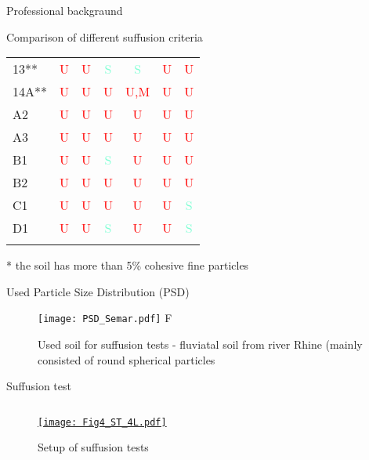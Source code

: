 \documentclass[10pt,xcolor=dvipsnames]{beamer}
\begin{document}
{\begin{frame}{Professional backgraund}
\begin{frame}{Comparison of different suffusion criteria}
\begin{table}[b]
{\begin{center}
\begin{tabular}{lcccccc}
13**&  \textcolor{red}{U} & \textcolor{red}{U}  & \textcolor{Aquamarine}{S} & \textcolor{Aquamarine}{S}& \textcolor{red}{U} & \textcolor{red}{U} \\
14A**&\textcolor{red}{U} & \textcolor{red}{U}   & \textcolor{red}{U}    & \textcolor{red}{U,M} & \textcolor{red}{U} & \textcolor{red}{U} \\
A2 & \textcolor{red}{U} & \textcolor{red}{U}    & \textcolor{red}{U}    & \textcolor{red}{U}   & \textcolor{red}{U} & \textcolor{red}{U} \\
A3 & \textcolor{red}{U} & \textcolor{red}{U}    & \textcolor{red}{U}    & \textcolor{red}{U}   & \textcolor{red}{U} & \textcolor{red}{U}\\
B1 & \textcolor{red}{U} & \textcolor{red}{U}    & \textcolor{Aquamarine}{S} &\textcolor{red}{U}    & \textcolor{red}{U} & \textcolor{red}{U} \\
B2 & \textcolor{red}{U} & \textcolor{red}{U}    & \textcolor{red}{U}    & \textcolor{red}{U}   & \textcolor{red}{U} & \textcolor{red}{U} \\
C1 & \textcolor{red}{U} & \textcolor{red}{U}    & \textcolor{red}{U}    & \textcolor{red}{U}   & \textcolor{red}{U} & \textcolor{Aquamarine}{S} \\
D1 & \textcolor{red}{U} & \textcolor{red}{U}    & \textcolor{Aquamarine}{S} & \textcolor{red}{U}   & \textcolor{red}{U} & \textcolor{Aquamarine}{S}\\\arrayrulecolor{black}\hline
\end{tabular}
    \label{tab:Internal_assessment_sad2012}  
\end{center}
}%
\end{table}
{\small ** the soil has more than 5\% cohesive fine particles}
\end{frame}

\begin{frame}{Used Particle Size Distribution (PSD)}
\begin{figure}[H]
   \centering
\texttt{[image: PSD\_Semar.pdf]} F
    \caption{Used soil for suffusion tests - fluviatal soil from river Rhine (mainly consisted of round spherical particles}
    \label{fig:suff_test_psd}
\end{figure}

\end{frame}

\begin{frame}[fragile]{Suffusion test} \label{suffusion}

\begin{columns}
\begin{column}{.46\textwidth}
\begin{figure}
	\centering
		\hyperlink{img1_ST_setup}{   \texttt{[image: Fig4\_ST\_4L.pdf]}   }
	\caption{Setup of suffusion tests}
	\label{fig:Fig4_ST_4L}
\end{figure}


\end{column}
\end{columns}
\end{frame}
\end{frame}}
\end{document}
